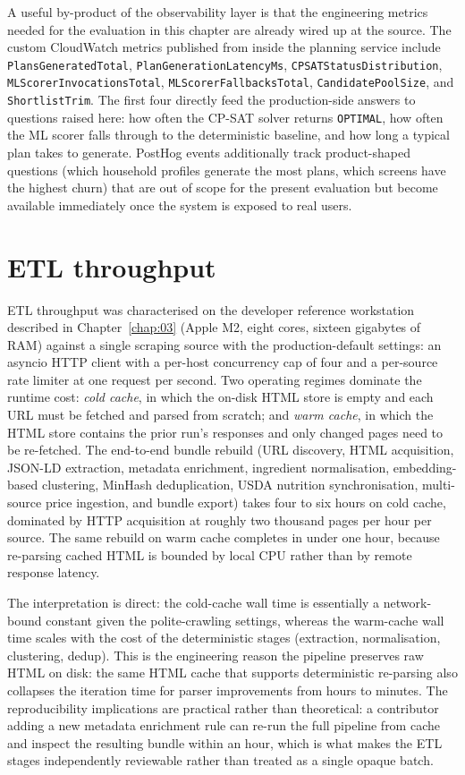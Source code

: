A useful by-product of the observability layer is that the engineering metrics needed for the evaluation in this chapter are already wired up at the source. The custom CloudWatch metrics published from inside the planning service include \texttt{PlansGeneratedTotal}, \texttt{PlanGenerationLatencyMs}, \texttt{CPSATStatusDistribution}, \texttt{MLScorerInvocationsTotal}, \texttt{MLScorerFallbacksTotal}, \texttt{CandidatePoolSize}, and \texttt{ShortlistTrim}. The first four directly feed the production-side answers to questions raised here: how often the CP-SAT solver returns \texttt{OPTIMAL}, how often the ML scorer falls through to the deterministic baseline, and how long a typical plan takes to generate. PostHog events additionally track product-shaped questions (which household profiles generate the most plans, which screens have the highest churn) that are out of scope for the present evaluation but become available immediately once the system is exposed to real users.

\section{ETL throughput}

ETL throughput was characterised on the developer reference workstation described in Chapter~\ref{chap:03} (Apple M2, eight cores, sixteen gigabytes of RAM) against a single scraping source with the production-default settings: an asyncio HTTP client with a per-host concurrency cap of four and a per-source rate limiter at one request per second. Two operating regimes dominate the runtime cost: \emph{cold cache}, in which the on-disk HTML store is empty and each URL must be fetched and parsed from scratch; and \emph{warm cache}, in which the HTML store contains the prior run's responses and only changed pages need to be re-fetched. The end-to-end bundle rebuild (URL discovery, HTML acquisition, JSON-LD extraction, metadata enrichment, ingredient normalisation, embedding-based clustering, MinHash deduplication, USDA nutrition synchronisation, multi-source price ingestion, and bundle export) takes four to six hours on cold cache, dominated by HTTP acquisition at roughly two thousand pages per hour per source. The same rebuild on warm cache completes in under one hour, because re-parsing cached HTML is bounded by local CPU rather than by remote response latency.

The interpretation is direct: the cold-cache wall time is essentially a network-bound constant given the polite-crawling settings, whereas the warm-cache wall time scales with the cost of the deterministic stages (extraction, normalisation, clustering, dedup). This is the engineering reason the pipeline preserves raw HTML on disk: the same HTML cache that supports deterministic re-parsing also collapses the iteration time for parser improvements from hours to minutes. The reproducibility implications are practical rather than theoretical: a contributor adding a new metadata enrichment rule can re-run the full pipeline from cache and inspect the resulting bundle within an hour, which is what makes the ETL stages independently reviewable rather than treated as a single opaque batch.


